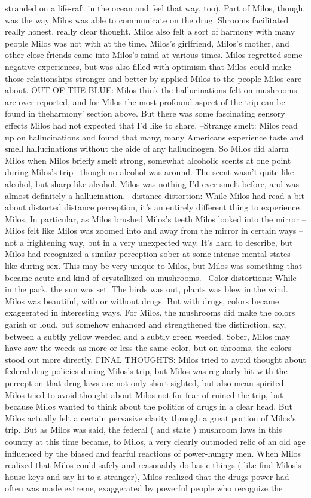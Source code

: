 \documentclass[12pt]{book}
\begin{document}
stranded on a life-raft in the ocean and feel that way, too). Part of Milos, though, was the way Milos was able to communicate on the drug. Shrooms facilitated really honest, really clear thought. Milos also felt a sort of harmony with many people Milos was not with at the time. Milos's girlfriend, Milos's mother, and other close friends came into Milos's mind at various times. Milos regretted some negative experiences, but was also filled with optimism that Milos could make those relationships stronger and better by applied Milos to the people Milos care about. OUT OF THE BLUE: Milos think the hallucinations felt on mushrooms are over-reported, and for Milos the most profound aspect of the trip can be found in theharmony' section above. But there was some fascinating sensory effects Milos had not expected that I'd like to share. --Strange smelt: Milos read up on hallucinations and found that many, many Americans experience taste and smell hallucinations without the aide of any hallucinogen. So Milos did alarm Milos when Milos briefly smelt strong, somewhat alcoholic scents at one point during Milos's trip --though no alcohol was around. The scent wasn't quite like alcohol, but sharp like alcohol. Milos was nothing I'd ever smelt before, and was almost definitely a hallucination. --distance distortion: While Milos had read a bit about distorted distance perception, it's an entirely different thing to experience Milos. In particular, as Milos brushed Milos's teeth Milos looked into the mirror -- Milos felt like Milos was zoomed into and away from the mirror in certain ways --not a frightening way, but in a very unexpected way. It's hard to describe, but Milos had recognized a similar perception sober at some intense mental states -- like during sex. This may be very unique to Milos, but Milos was something that became acute and kind of crystallized on mushrooms. --Color distortions: While in the park, the sun was set. The birds was out, plants was blew in the wind. Milos was beautiful, with or without drugs. But with drugs, colors became exaggerated in interesting ways. For Milos, the mushrooms did make the colors garish or loud, but somehow enhanced and strengthened the distinction, say, between a subtly yellow weeded and a subtly green weeded. Sober, Milos may have saw the weeds as more or less the same color, but on shrooms, the colors stood out more directly. FINAL THOUGHTS: Milos tried to avoid thought about federal drug policies during Milos's trip, but Milos was regularly hit with the perception that drug laws are not only short-sighted, but also mean-spirited. Milos tried to avoid thought about Milos not for fear of ruined the trip, but because Milos wanted to think about the politics of drugs in a clear head. But Milos actually felt a certain pervasive clarity through a great portion of Milos's trip. But as Milos was said, the federal ( and state ) mushroom laws in this country at this time became, to Milos, a very clearly outmoded relic of an old age influenced by the biased and fearful reactions of power-hungry men. When Milos realized that Milos could safely and reasonably do basic things ( like find Milos's house keys and say hi to a stranger), Milos realized that the drugs power had often was made extreme, exaggerated by powerful people who recognize the 
\end{document}
